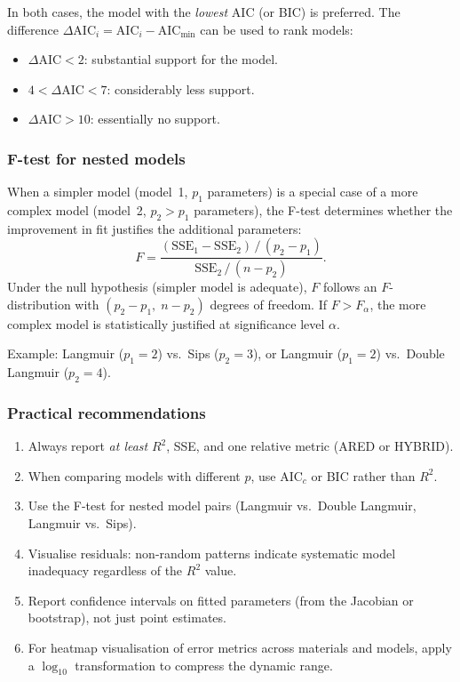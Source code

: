 	In both cases, the model with the \emph{lowest} AIC (or BIC) is
	preferred. The difference $\Delta\mathrm{AIC}_i = \mathrm{AIC}_i
	- \mathrm{AIC}_{\min}$ can be used to rank models:
	\begin{itemize}
		\item $\Delta\mathrm{AIC} < 2$: substantial support for
		the model.
		\item $4 < \Delta\mathrm{AIC} < 7$: considerably less support.
		\item $\Delta\mathrm{AIC} > 10$: essentially no support.
	\end{itemize}

	\subsubsection{F-test for nested models}

	When a simpler model (model~1, $p_1$ parameters) is a special case
	of a more complex model (model~2, $p_2 > p_1$ parameters), the
	F-test determines whether the improvement in fit justifies the
	additional parameters:
	\begin{equation}
		F = \frac{(\mathrm{SSE}_1 - \mathrm{SSE}_2)\,/\,
			(p_2 - p_1)}
		{\mathrm{SSE}_2\,/\,(n - p_2)}.
		\label{eq:Ftest}
	\end{equation}
	Under the null hypothesis (simpler model is adequate), $F$ follows
	an $F$-distribution with $(p_2 - p_1,\; n - p_2)$ degrees of
	freedom. If $F > F_{\alpha}$, the more complex model is
	statistically justified at significance level $\alpha$.

	Example: Langmuir ($p_1 = 2$) vs.\ Sips ($p_2 = 3$), or
	Langmuir ($p_1 = 2$) vs.\ Double Langmuir ($p_2 = 4$).

	\subsubsection{Practical recommendations}

	\begin{enumerate}
		\item Always report \emph{at least} $R^{2}$, SSE, and one
		relative metric (ARED or HYBRID).
		\item When comparing models with different $p$, use AIC$_c$
		or BIC rather than $R^{2}$.
		\item Use the F-test for nested model pairs
		(Langmuir vs.\ Double Langmuir, Langmuir vs.\ Sips).
		\item Visualise residuals: non-random patterns indicate
		systematic model inadequacy regardless of the $R^{2}$ value.
		\item Report confidence intervals on fitted parameters
		(from the Jacobian or bootstrap), not just point estimates.
		\item For heatmap visualisation of error metrics across
		materials and models, apply a $\log_{10}$ transformation to
		compress the dynamic range.
	\end{enumerate}

